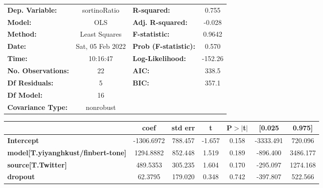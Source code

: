 \begin{center}
\begin{tabular}{lclc}
\toprule
\textbf{Dep. Variable:}                    &   sortinoRatio   & \textbf{  R-squared:         } &     0.755   \\
\textbf{Model:}                            &       OLS        & \textbf{  Adj. R-squared:    } &    -0.028   \\
\textbf{Method:}                           &  Least Squares   & \textbf{  F-statistic:       } &    0.9642   \\
\textbf{Date:}                             & Sat, 05 Feb 2022 & \textbf{  Prob (F-statistic):} &    0.570    \\
\textbf{Time:}                             &     10:16:47     & \textbf{  Log-Likelihood:    } &   -152.26   \\
\textbf{No. Observations:}                 &          22      & \textbf{  AIC:               } &     338.5   \\
\textbf{Df Residuals:}                     &           5      & \textbf{  BIC:               } &     357.1   \\
\textbf{Df Model:}                         &          16      & \textbf{                     } &             \\
\textbf{Covariance Type:}                  &    nonrobust     & \textbf{                     } &             \\
\bottomrule
\end{tabular}
\begin{tabular}{lcccccc}
                                           & \textbf{coef} & \textbf{std err} & \textbf{t} & \textbf{P$> |$t$|$} & \textbf{[0.025} & \textbf{0.975]}  \\
\midrule
\textbf{Intercept}                         &   -1306.6972  &      788.457     &    -1.657  &         0.158        &    -3333.491    &      720.096     \\
\textbf{model[T.yiyanghkust/finbert-tone]} &    1294.8882  &      852.448     &     1.519  &         0.189        &     -896.400    &     3486.177     \\
\textbf{source[T.Twitter]}                 &     489.5353  &      305.235     &     1.604  &         0.170        &     -295.097    &     1274.168     \\
\textbf{dropout}                           &      62.3795  &      179.020     &     0.348  &         0.742        &     -397.807    &      522.566     \\

\end{tabular}
\end{center}
